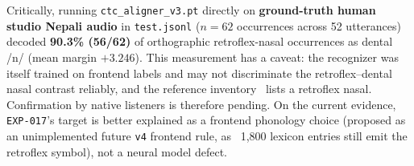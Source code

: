 Critically, running \texttt{ctc\_aligner\_v3.pt} directly on \textbf{ground-truth human studio Nepali audio} in \texttt{test.jsonl} ($n=62$ occurrences across 52 utterances) decoded \textbf{90.3\% (56/62)} of orthographic retroflex-nasal occurrences as dental /n/ (mean margin $+3.246$). This measurement has a caveat: the recognizer was itself trained on frontend labels and may not discriminate the retroflex--dental nasal contrast reliably, and the reference inventory~\cite{khatiwada2009nepali} lists a retroflex nasal. Confirmation by native listeners is therefore pending. On the current evidence, \texttt{EXP-017}'s target is better explained as a frontend phonology choice (proposed as an unimplemented future \texttt{v4} frontend rule, as ~1,800 lexicon entries still emit the retroflex symbol), not a neural model defect.
